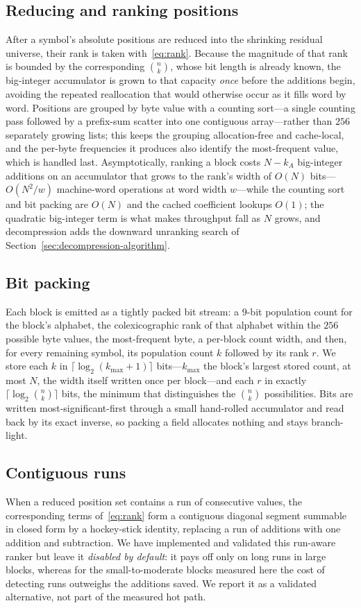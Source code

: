 \documentclass[entropy,article,submit,oneauthor,pdftex]{Definitions/mdpi}
\begin{document}
\subsection{Reducing and ranking positions}
After a symbol's absolute positions are reduced into the shrinking residual
universe, their rank is taken with~\eqref{eq:rank}. Because the magnitude of that
rank is bounded by the corresponding $\binom{n}{k}$, whose bit length is already
known, the big-integer accumulator is grown to that capacity \emph{once} before
the additions begin, avoiding the repeated reallocation that would otherwise
occur as it fills word by word. Positions are grouped by byte value with a
counting sort---a single counting pass followed by a prefix-sum scatter into one
contiguous array---rather than $256$ separately growing lists; this keeps the
grouping allocation-free and cache-local, and the per-byte frequencies it
produces also identify the most-frequent value, which is handled last. Asymptotically,
ranking a block costs $N-k_A$ big-integer additions on an accumulator that grows to the
rank's width of $O(N)$ bits---$O(N^2/w)$ machine-word operations at word width $w$---while
the counting sort and bit packing are $O(N)$ and the cached coefficient lookups $O(1)$; the
quadratic big-integer term is what makes throughput fall as $N$ grows, and decompression
adds the downward unranking search of Section~\ref{sec:decompression-algorithm}.

\subsection{Bit packing}
Each block is emitted as a tightly packed bit stream: a $9$-bit population count
for the block's alphabet, the colexicographic rank of that alphabet within the
$256$ possible byte values, the most-frequent byte, a per-block count width, and then,
for every remaining symbol, its population count $k$ followed by its rank $r$. We store
each $k$ in $\lceil\log_2(k_{\max}{+}1)\rceil$ bits---$k_{\max}$ the block's largest
stored count, at most $N$, the width itself written once per block---and each $r$ in
exactly $\lceil\log_2\binom{n}{k}\rceil$ bits, the minimum that distinguishes the
$\binom{n}{k}$ possibilities. Bits are
written most-significant-first through a small hand-rolled accumulator and read
back by its exact inverse, so packing a field allocates nothing and stays
branch-light.

\subsection{Contiguous runs}
When a reduced position set contains a run of consecutive values, the corresponding terms
of~\eqref{eq:rank} form a contiguous diagonal segment summable in closed form by a
hockey-stick identity, replacing a run of additions with one addition and subtraction. We
have implemented and validated this run-aware ranker but leave it \emph{disabled by
default}: it pays off only on long runs in large blocks, whereas for the small-to-moderate
blocks measured here the cost of detecting runs outweighs the additions saved. We report it
as a validated alternative, not part of the measured hot path.
\end{document}
